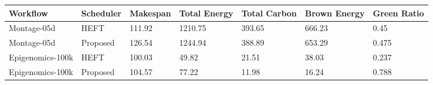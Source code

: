 \begin{tabular}{lllllll}
\hline
Workflow & Scheduler & Makespan & Total Energy & Total Carbon & Brown Energy & Green Ratio \\
\hline
Montage-05d & HEFT & 111.92 & 1210.75 & 393.65 & 666.23 & 0.45 \\
Montage-05d & Proposed & 126.54 & 1244.94 & 388.89 & 653.29 & 0.475 \\
Epigenomics-100k & HEFT & 100.03 & 49.82 & 21.51 & 38.03 & 0.237 \\
Epigenomics-100k & Proposed & 104.57 & 77.22 & 11.98 & 16.24 & 0.788 \\
\hline
\end{tabular}
